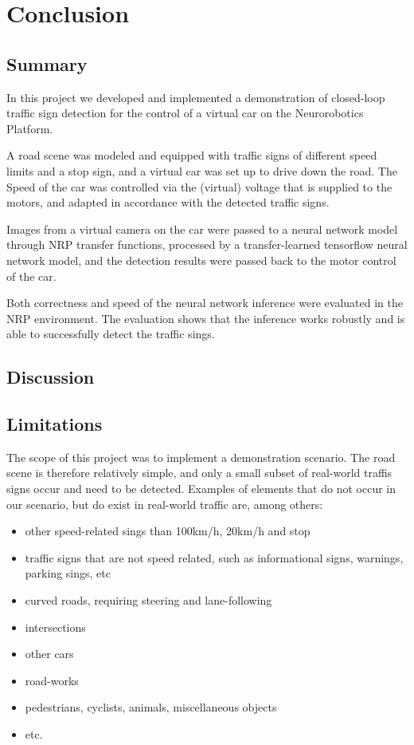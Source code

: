 
\section{Conclusion}

\subsection{Summary}

In this project we developed and implemented a demonstration of closed-loop traffic sign detection for the control of a virtual car on the Neurorobotics Platform. 

A road scene was modeled and equipped with traffic signs of different speed limits and a stop sign, and a virtual car was set up to drive down the road. The Speed of the car was controlled via the (virtual) voltage that is supplied to the motors, and adapted in accordance with the detected traffic signs.

Images from a virtual camera on the car were passed to a neural network model through NRP transfer functions, processed by a transfer-learned tensorflow neural network model, and the detection results were passed back to the motor control of the car.

Both correctness and speed of the neural network inference were evaluated in the NRP environment. The evaluation shows that the inference works robustly and is able to successfully detect the traffic sings.

\subsection{Discussion}

\subsection{Limitations}
The scope of this project was to implement a demonstration scenario. 
The road scene is therefore relatively simple, and only a small subset of real-world traffis signs occur and need to be detected. 
Examples of elements that do not occur in our scenario, but do exist in real-world traffic are, among others:
\begin{itemize}
 \item other speed-related sings than 100km/h, 20km/h and stop
 \item traffic signs that are not speed related, such as informational signs, warnings, parking sings, etc
 \item curved roads, requiring steering and lane-following
 \item intersections
 \item other cars
 \item road-works
 \item pedestrians, cyclists, animals, miscellaneous objects
 \item etc.
\end{itemize}

